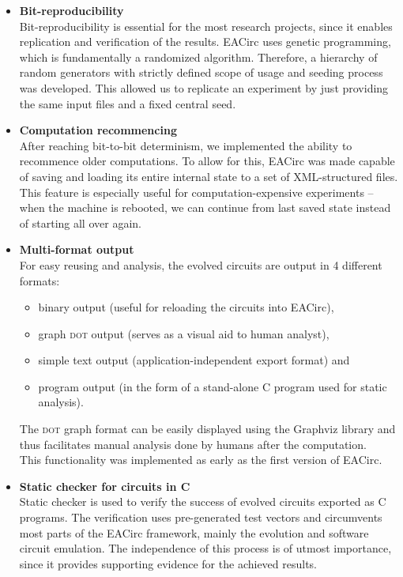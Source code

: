 \documentclass[12pt,oneside]{fithesis2}		%
\renewcommand{\_}{\leavevmode \kern0.0em\vbox{\hrule width0.4em}}
\newcommand{\squarebullet}{\textcolor{black}{\raisebox{0.15em}{\rule{4pt}{4pt}}}}
\newenvironment{myItemize}{
  \begin{itemize}[leftmargin=2em,rightmargin=1em,itemsep=\parskip ,parsep=0em,topsep=0em,partopsep=0em]
  \renewcommand{\labelitemi}{\squarebullet}
  \renewcommand{\labelitemii}{$\diamond$}
}{
  \end{itemize}
}
\begin{document}
\begin{myItemize}
\item \textbf{Bit-reproducibility}\\
Bit-reproducibility is essential for the most research projects, since it enables replication and verification of the results.
EACirc uses genetic programming, which is fundamentally a randomized algorithm. Therefore, a hierarchy of random
generators with strictly defined scope of usage and seeding process was developed. This allowed us to replicate an experiment
by just providing the same input files and a fixed central seed.
\item \textbf{Computation recommencing}\\
After reaching bit-to-bit determinism, we implemented the ability to recommence older computations. 
To allow for this, EACirc was made capable of saving and loading its entire internal state to a set of XML-structured files.
This feature is especially useful for computation-expensive experiments -- when the machine is rebooted, we can continue from last saved state instead of starting all over again.
\item \textbf{Multi-format output}\\
For easy reusing and analysis, the evolved circuits are output in 4 different formats:
\begin{myItemize}
\item binary output (useful for reloading the circuits into EACirc),
\item graph \textsc{dot} output (serves as a visual aid to human analyst),
\item simple text output (application-independent export format) and
\item program output (in the form of a stand-alone C program used for static analysis).
\end{myItemize}
\noindent
The \textsc{dot} graph format can be easily displayed using the Graphviz library \parencite{graphviz} and thus 
facilitates manual analysis done by humans after the computation.\\
This functionality was implemented as early as the first version of EACirc. 
\item \textbf{Static checker for circuits in C}\\
Static checker is used to verify the success of evolved circuits exported as C programs. 
The verification uses pre-generated test vectors
and circumvents most parts of the EACirc framework, mainly the evolution and software circuit emulation.
The independence of this process is of utmost importance, since it provides supporting evidence for the achieved results.

\end{myItemize}
\end{document}
